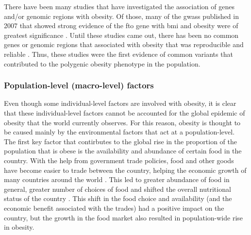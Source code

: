 There have been many studies that have investigated the association of genes and/or genomic regions with obesity.
Of those, many of the \glspl{gwas} published in 2007 that showed strong evidence of the \gls{fto} gene with \gls{bmi} and obesity were of greatest significance \citep{Dina2007,Frayling2007,Gerken2007,Scuteri2007}.
Until these studies came out, there has been no common genes or genomic regions that associated with obesity that was reproducible and reliable \citep{Frayling2007}.
Thus, these studies were the first evidence of common variants that contributed to the polygenic obesity phenotype in the population.


\subsubsection{Population-level (macro-level) factors}
\label{ssub:Population-level_(macro-level)_factors}

Even though some individual-level factors are involved with obesity, it is clear that these individual-level factors cannot be accounted for the global epidemic of obesity that the world currently observes.
For this reason, obesity is thought to be caused mainly by the environmental factors that act at a population-level.\\

\noindent
The first key factor that contirbutes to the global rise in the proportion of the population that is obese is the availability and abundance of certain food in the country.
With the help from government trade policies, food and other goods have become easier to trade between the country, helping the economic growth of many countries around the world \citep{Kearney2010}.
This led to greater abundance of food in general, greater number of choices of food and shifted the overall nutritional status of the country \citep{Malik2013}.
This shift in the food choice and availability (and the economic benefit associated with the trades) had a positive impact on the country, but the growth in the food market also resulted in population-wide rise in obesity.

